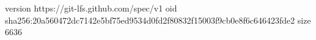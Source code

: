 version https://git-lfs.github.com/spec/v1
oid sha256:20a560472dc7142e5bf75ed9534d0fd2f80832f15003f9cb0e8f6c646423fde2
size 6636
